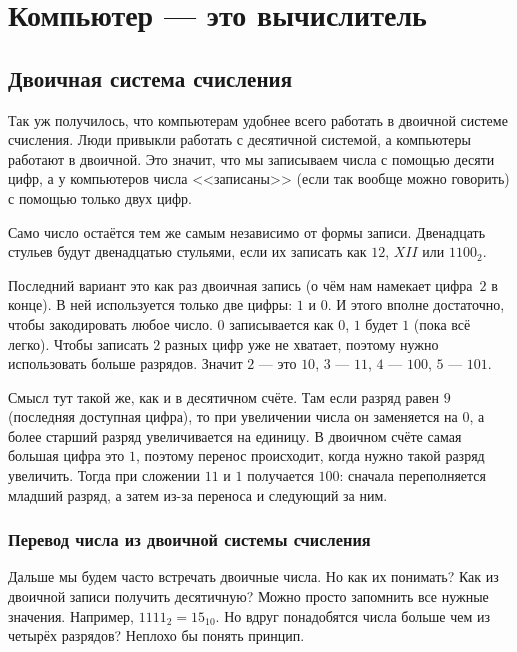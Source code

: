 
\chapter{Компьютер --- это вычислитель}



\section{Двоичная система счисления}

Так уж получилось, что компьютерам удобнее всего работать в двоичной системе счисления.
Люди привыкли работать с десятичной системой, а компьютеры работают в двоичной.
Это значит, что мы записываем числа с помощью десяти цифр, а у компьютеров
числа <<записаны>> (если так вообще можно говорить) с помощью только двух цифр.

Само число остаётся тем же самым независимо от формы записи. Двенадцать стульев
будут двенадцатью стульями, если их записать как $12$, $XII$ или $1100_2$.

Последний вариант это как раз двоичная запись (о чём нам намекает цифра~$2$ в конце).
В ней используется только две цифры: $1$ и $0$. И этого вполне достаточно, чтобы закодировать
любое число. $0$ записывается как $0$, $1$ будет $1$ (пока всё легко). Чтобы записать $2$
разных цифр уже не хватает, поэтому нужно использовать больше разрядов. Значит $2$ --- это $10$,
$3$ --- $11$, $4$ --- $100$, $5$ --- $101$.

Смысл тут такой же, как и в десятичном счёте. Там если разряд равен $9$ (последняя доступная цифра),
то при увеличении числа он заменяется на $0$, а более старший разряд увеличивается на единицу.
В двоичном счёте самая большая цифра это $1$, поэтому перенос происходит, когда нужно такой разряд
увеличить. Тогда при сложении $11$ и $1$ получается $100$: сначала переполняется младший разряд,
а затем из-за переноса и следующий за ним.

\subsection{Перевод числа из двоичной системы счисления}

Дальше мы будем часто встречать двоичные числа. Но как их понимать?
Как из двоичной записи получить десятичную?
Можно просто запомнить все нужные значения. Например, $1111_2=15_{10}$.
Но вдруг понадобятся числа больше чем из четырёх разрядов? Неплохо бы понять принцип.

